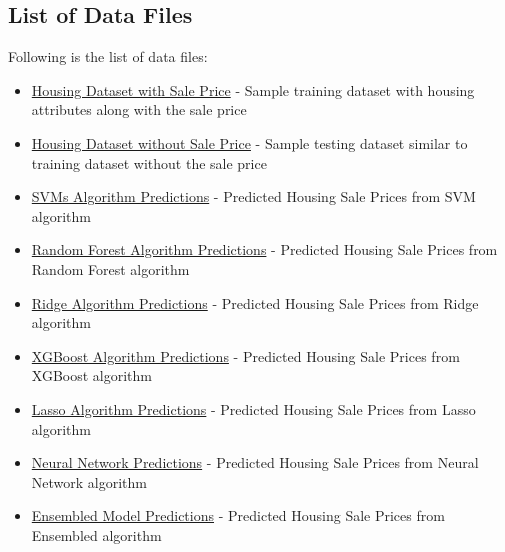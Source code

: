 \documentclass[sigconf]{acmart}
\begin{document}
     \subsection{List of Data Files}    
     Following is the list of data files:
    \begin{itemize}        
    	\item \href{https://github.com/bigdata-i523/hid306/blob/master/project/data/train.csv}{Housing Dataset with Sale Price} - Sample training dataset with housing attributes along with the sale price
    	\item \href{https://github.com/bigdata-i523/hid306/blob/master/project/data/test.csv}{Housing Dataset without Sale Price} - Sample testing dataset similar to training dataset without the sale price
    	
       	\item \href{https://github.com/bigdata-i523/hid306/blob/master/project/data/kaggle_python_svm.csv}{SVMs Algorithm Predictions} - Predicted Housing Sale Prices from SVM algorithm
       
		\item \href{https://github.com/bigdata-i523/hid306/blob/master/project/data/kaggle_python_random_forest.csv}{Random Forest Algorithm Predictions} - Predicted Housing Sale Prices from Random Forest algorithm
		
		\item \href{https://github.com/bigdata-i523/hid306/blob/master/project/data/kaggle_python_ridge.csv}{Ridge Algorithm Predictions} - Predicted Housing Sale Prices from Ridge algorithm
		
		\item \href{https://github.com/bigdata-i523/hid306/blob/master/project/data/kaggle_python_xgboost.csv}{XGBoost Algorithm Predictions} - Predicted Housing Sale Prices from XGBoost algorithm
		
		\item \href{https://github.com/bigdata-i523/hid306/blob/master/project/data/kaggle_python_lasso.csv}{Lasso Algorithm Predictions} - Predicted Housing Sale Prices from Lasso algorithm
		
		\item \href{https://github.com/bigdata-i523/hid306/blob/master/project/data/kaggle_python_neural_network.csv}{Neural Network Predictions} - Predicted Housing Sale Prices from Neural Network algorithm
		
		\item \href{https://github.com/bigdata-i523/hid306/blob/master/project/data/kaggle_python_ensemble.csv}{Ensembled Model Predictions} - Predicted Housing Sale Prices from Ensembled algorithm    	
	\end{itemize}    
   
\end{document}
